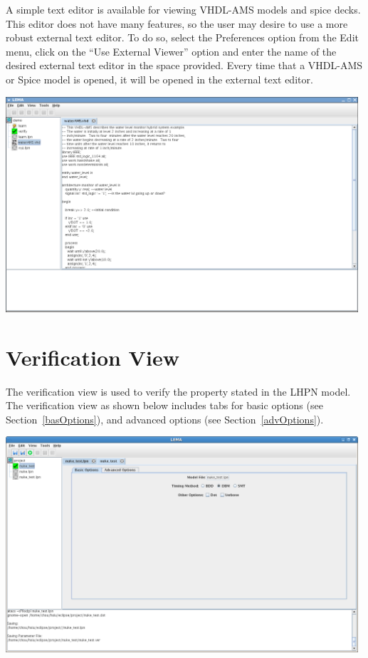 \documentclass[titlepage,11pt]{article}
\begin{document}
\noindent
A simple text editor is available for viewing VHDL-AMS models and spice decks.
This editor does not have many features, so the user may desire to use a  more
robust external text editor.  To do so, select the Preferences option from the
Edit menu, click on the ``Use External Viewer'' option and enter the name of
the desired external text editor in the space provided.  Every time that a 
VHDL-AMS or Spice model is opened, it will be opened in the external text 
editor.
\begin{center}
\includegraphics[height=80mm]{screenshots/VHDLedit}
\end{center}
\clearpage

\section{\label{Verification}Verification View}

\noindent
The verification view is used to verify the property stated in the LHPN model.
 The verification view as shown below includes tabs for 
basic options (see Section~\ref{basOptions}),  and
advanced options (see Section~\ref{advOptions}).
\begin{center}
\includegraphics[height=80mm]{screenshots/verificationView}
\end{center}
\end{document}

